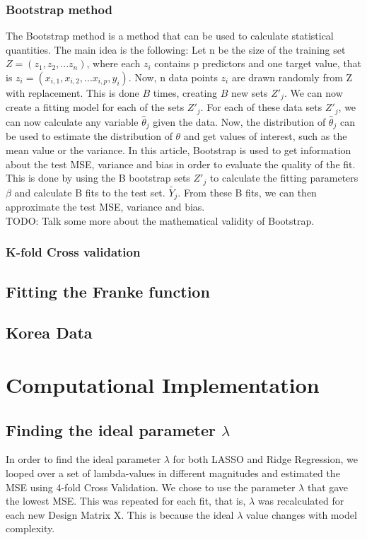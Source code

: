 \documentclass[11pt,a4paper]{article}
\begin{document}
\subsubsection{Bootstrap method}
The Bootstrap method is a method that can be used to calculate statistical quantities. The main idea is the following: Let n be the size of the training set $Z=(z_1,z_2,...z_n)$, where each $z_i$ contains p predictors and one target value, that is $z_i=(x_{i,1},x_{i,2},...x_{i,p},y_i)$. Now, n data points $z_i$ are drawn randomly from Z with replacement. This is done $B$ times, creating $B$ new sets $Z'_j$. We can now create a fitting model for each of the sets  $Z'_j$. For each of these data sets $Z'_j$, we can now calculate any variable $\hat\theta_j$ given the data. Now, the distribution of $\hat\theta_j$ can be used to estimate the distribution of $\theta$ and get values of interest, such as the mean value or the variance. In this article, Bootstrap is used to get information about the test MSE, variance and bias in order to evaluate the quality of the fit. This is done by using the B bootstrap sets $Z'_j$ to calculate the fitting parameters $\beta$ and calculate B fits to the test set. $\tilde{Y_j}$. From these B fits, we can then approximate the test MSE, variance and bias.\\
TODO: Talk some more about the mathematical validity of Bootstrap.
\subsubsection{K-fold Cross validation}
\subsection{Fitting the Franke function}
\subsection{Korea Data}
\section{Computational Implementation}
\subsection{Finding the ideal parameter $\lambda$}
In order to find the ideal parameter $\lambda$ for both LASSO and Ridge Regression, we looped over a set of lambda-values in different magnitudes and estimated the MSE using 4-fold Cross Validation. We chose to use the parameter $\lambda$ that gave the lowest MSE. This was repeated for each fit, that is,  $\lambda$ was recalculated for each new Design Matrix X. This is because the ideal $\lambda$ value changes with model complexity.
\end{document}
